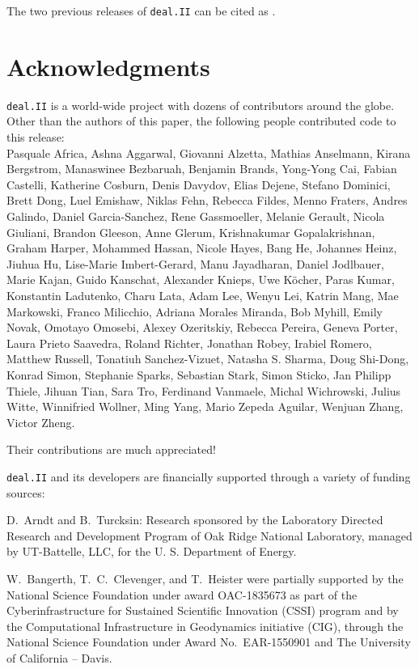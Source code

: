 \documentclass{ansarticle-preprint}
\newcommand{\specialword}[1]{\texttt{#1}}
\newcommand{\dealii}{{\specialword{deal.II}}\xspace}
\begin{document}
The two previous releases of \dealii{} can be cited as
\cite{dealII90,dealII91}.


\section{Acknowledgments}

\dealii{} is a world-wide project with dozens of contributors around the
globe. Other than the authors of this paper, the following people
contributed code to this release:\\
%
%
Pasquale Africa,
Ashna Aggarwal,
Giovanni Alzetta,
Mathias Anselmann,
Kirana Bergstrom,
Manaswinee Bezbaruah,
Benjamin Brands,
Yong-Yong Cai,
Fabian Castelli,
Katherine Cosburn,
Denis Davydov,
Elias Dejene,
Stefano Dominici,
Brett Dong,
Luel Emishaw,
Niklas Fehn,
Rebecca Fildes,
Menno Fraters,
Andres Galindo,
Daniel Garcia-Sanchez,
Rene Gassmoeller,
Melanie Gerault,
Nicola Giuliani,
Brandon Gleeson,
Anne Glerum,
Krishnakumar Gopalakrishnan,
Graham Harper,
Mohammed Hassan,
Nicole Hayes,
Bang He,
Johannes Heinz,
Jiuhua Hu,
Lise-Marie Imbert-Gerard,
Manu Jayadharan,
Daniel Jodlbauer,
Marie Kajan,
Guido Kanschat,
Alexander Knieps,
Uwe K{\"o}cher,
Paras Kumar,
Konstantin Ladutenko,
Charu Lata,
Adam Lee,
Wenyu Lei,
Katrin Mang,
Mae Markowski,
Franco Milicchio,
Adriana Morales Miranda,
Bob Myhill,
Emily Novak,
Omotayo Omosebi,
Alexey Ozeritskiy,
Rebecca Pereira,
Geneva Porter,
Laura Prieto Saavedra,
Roland Richter,
Jonathan Robey,
Irabiel Romero,
Matthew Russell,
Tonatiuh Sanchez-Vizuet,
Natasha S. Sharma,
Doug Shi-Dong,
Konrad Simon,
Stephanie Sparks,
Sebastian Stark,
Simon Sticko,
Jan Philipp Thiele,
Jihuan Tian,
Sara Tro,
Ferdinand Vanmaele,
Michal Wichrowski,
Julius Witte,
Winnifried Wollner,
Ming Yang,
Mario Zepeda Aguilar,
Wenjuan Zhang,
Victor Zheng.

Their contributions are much appreciated!


\bigskip

\dealii{} and its developers are financially supported through a
variety of funding sources:

D.~Arndt and B.~Turcksin: Research sponsored by the Laboratory Directed Research and
Development Program of Oak Ridge National Laboratory, managed by UT-Battelle,
LLC, for the U. S. Department of Energy.

W.~Bangerth, T.~C.~Clevenger, and T.~Heister were partially
supported by the National Science Foundation under award OAC-1835673
as part of the Cyberinfrastructure for Sustained Scientific Innovation (CSSI)
program  and by the Computational Infrastructure
in Geodynamics initiative (CIG), through the National Science
Foundation under Award No.~EAR-1550901 and The
University of California -- Davis.
\end{document}
